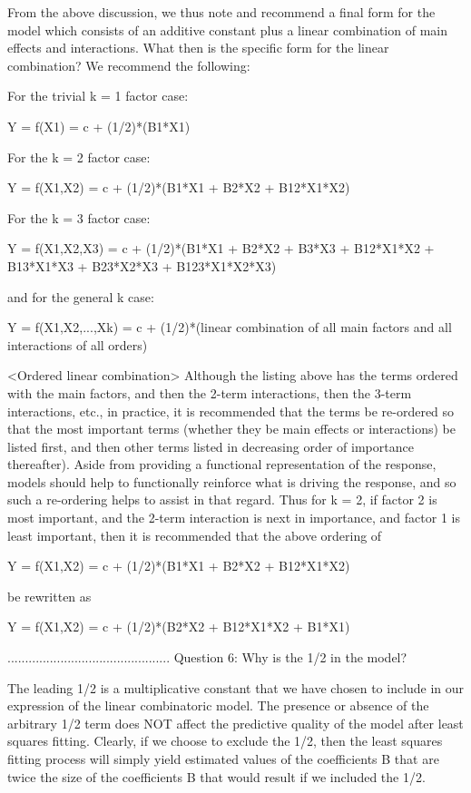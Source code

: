 From the above discussion, we thus note and
recommend a final form for the model which
consists of an additive constant plus a linear
combination of main effects and interactions.
What then is the specific form for the linear
combination?  We recommend the following:

   For the trivial k = 1 factor case:

      Y = f(X1) = c + (1/2)*(B1*X1)

   For the k = 2 factor case:

      Y = f(X1,X2) = c + (1/2)*(B1*X1 + B2*X2 + B12*X1*X2)

   For the k = 3 factor case:

      Y = f(X1,X2,X3) = c + (1/2)*(B1*X1 + B2*X2 + B3*X3 +
                                   B12*X1*X2 + B13*X1*X3 +
                                   B23*X2*X3 + B123*X1*X2*X3)

and for the general k case:

      Y = f(X1,X2,...,Xk) = c + (1/2)*(linear combination
                                       of all main factors
                                       and all interactions
                                       of all orders)

<Ordered linear combination>
Although the listing above has the terms ordered
with the main factors, and then the 2-term
interactions, then the 3-term interactions, etc., in
practice, it is recommended that the terms be
re-ordered so that the most important terms
(whether they be main effects or interactions) be
listed first, and then other terms listed in
decreasing order of importance thereafter).  Aside
from providing a functional representation of the
response, models should help to functionally
reinforce what is driving the response, and so
such a re-ordering helps to assist in that regard.
Thus for k = 2, if factor 2 is most important, and
the 2-term interaction is next in importance, and
factor 1 is least important, then it is
recommended that the above ordering of

   Y = f(X1,X2) = c + (1/2)*(B1*X1 + B2*X2 + B12*X1*X2)

be rewritten as

   Y = f(X1,X2) = c + (1/2)*(B2*X2 + B12*X1*X2 + B1*X1)


..............................................
Question 6: Why is the 1/2 in the model?

The leading 1/2 is a multiplicative constant that
we have chosen to include in our expression of the
linear combinatoric model.  The presence or
absence of the arbitrary 1/2 term does NOT affect
the predictive quality of the model after least
squares fitting.  Clearly, if we choose to exclude
the 1/2, then the least squares fitting process
will simply yield estimated values of the
coefficients B that are twice the size of the
coefficients B that would result if we included
the 1/2.

